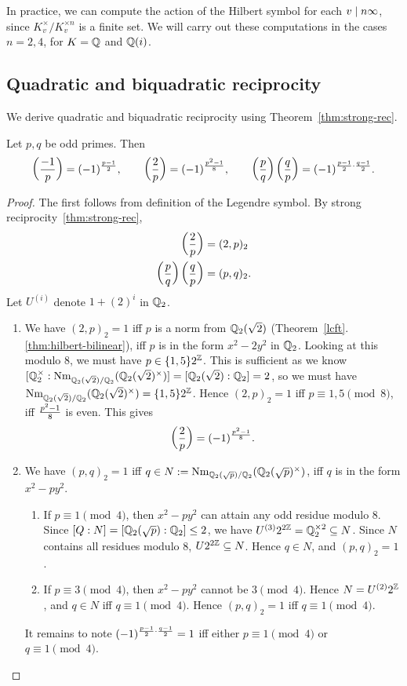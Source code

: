 In practice, we can compute the action of the Hilbert symbol for each $v\mid n\infty$, since $K_v^{\times}/K_v^{\times n}$ is a finite set. We will carry out these computations in the cases $n=2,4$, for $K=\mathbb{Q}$ and $\mathbb{Q}(i)$.
\subsection{Quadratic and biquadratic reciprocity}
We derive quadratic and biquadratic reciprocity using Theorem~\ref{thm:strong-rec}.
\begin{thm}
Let $p,q$ be odd primes. Then
\[
\left( {\frac{-1}{p}} \right)=(-1)^{\frac{p-1}{2}},\qquad \left( {\frac{2}{p}} \right)=(-1)^{\frac{p^2-1}{8}},\qquad \left( {\frac{p}{q}} \right) \left( {\frac{q}{p}} \right)=(-1)^{\frac{p-1}{2}\cdot \frac{q-1}{2}}.
\]
\end{thm}
\begin{proof}
The first follows from definition of the Legendre symbol. 
By strong reciprocity~\ref{thm:strong-rec}, 
\begin{align*}
\left( {\frac{2}{p}} \right)&=(2,p)_2\\
\left( {\frac{p}{q}} \right)\left( {\frac{q}{p}} \right)&=(p,q)_2.
\end{align*}
Let $U^{(i)}$ denote $1+(2)^i$ in $\mathbb{Q}_2$.
\begin{enumerate}
\item We have $(2,p)_2=1$ iff $p$ is a norm from $\mathbb{Q}_2(\sqrt 2)$ (Theorem~\ref{lcft}.\ref{thm:hilbert-bilinear}), iff $p$ is in the form $x^2-2y^2$ in $\mathbb{Q}_2$. Looking at this modulo 8, we must have $p\in \{1,5\}2^{\mathbb{Z}}$. This is sufficient as we know $[\mathbb{Q}_2^{\times}:\operatorname{Nm}_{\mathbb{Q}_2(\sqrt2)/\mathbb{Q}_2}(\mathbb{Q}_2(\sqrt2)^{\times})]=[\mathbb{Q}_2(\sqrt2):\mathbb{Q}_2]=2$, so we must have $\operatorname{Nm}_{\mathbb{Q}_2(\sqrt2)/\mathbb{Q}_2}(\mathbb{Q}_2(\sqrt2)^{\times})=\{1,5\}2^{\mathbb{Z}}$. Hence $(2,p)_2=1$ iff $p\equiv 1,5\pmod 8$, iff $\frac{p^2-1}{8}$ is even. This gives
\[
\left( {\frac{2}{p}} \right)=(-1)^{\frac{p^2-1}{8}}.
\]
\item We have $(p,q)_2=1$ iff $q\in N:=\operatorname{Nm}_{\mathbb{Q}_2(\sqrt p)/\mathbb{Q}_2}(\mathbb{Q}_2(\sqrt p)^{\times})$, iff $q$ is in the form $x^2-py^2$. 
\begin{enumerate}
\item
If $p\equiv 1\pmod 4$, then $x^2-py^2$ can attain any odd residue modulo 8. Since $[Q:N]=[\mathbb{Q}_2(\sqrt p):\mathbb{Q}_2]\le 2$, we have $U^{(3)}2^{2\mathbb{Z}}= \mathbb{Q}_2^{\times 2} \subseteq N$. Since $N$ contains all residues modulo 8, $U2^{2\mathbb{Z}}\subseteq N$. Hence $q\in N$, and $(p,q)_2=1$.
\item
If $p\equiv 3\pmod 4$, then $x^2-py^2$ cannot be $3\pmod 4$. Hence $N=U^{(2)}2^{\mathbb{Z}}$, and $q\in N$ iff $q\equiv 1\pmod 4$. Hence $(p,q)_2=1$ iff $q\equiv 1\pmod 4$.
\end{enumerate}
It remains to note $(-1)^{\frac{p-1}{2}\cdot \frac{q-1}{2}}=1$ iff either $p\equiv 1\pmod 4$ or $q\equiv 1\pmod 4$.
\qedhere
\end{enumerate}
\end{proof}
